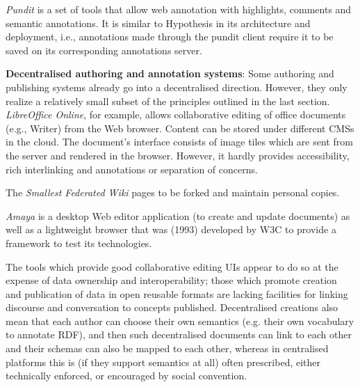 \documentclass[a4paper]{llncs}
\begin{document}
                                \textit{Pundit} is a set of tools that allow web annotation with highlights, comments and semantic annotations. It is similar to Hypothesis in its architecture and deployment, i.e., annotations made through the pundit client require it to be saved on its corresponding annotations server.




                            

                            
\par 
                                \textbf{Decentralised authoring and annotation systems}:
                                Some authoring and publishing systems already go into a decentralised direction. However, they only realize a relatively small subset of the principles outlined in the last section. \textit{LibreOffice Online}, for example, allows collaborative editing of office documents (e.g., Writer) from the Web browser. Content can be stored under different CMSs in the cloud. The document’s interface consists of image tiles which are sent from the server and rendered in the browser. However, it hardly provides accessibility, rich interlinking and annotations or separation of concerns.

                                The \textit{Smallest Federated Wiki} pages to be forked and maintain personal copies.

                                

                                \textit{Amaya} is a desktop Web editor application (to create and update documents) as well as a lightweight browser that was (1993) developed by W3C to provide a framework to test its technologies.
                            

                            
\par The tools which provide good collaborative editing UIs appear to do so at the expense of data ownership and interoperability; those which promote creation and publication of data in open reusable formats are lacking facilities for linking discourse and conversation to concepts published. Decentralised creations also mean that each author can choose their own semantics (e.g. their own vocabulary to annotate RDF), and then such decentralised documents can link to each other and their schemas can also be mapped to each other, whereas in centralised platforms this is (if they support semantics at all) often prescribed, either technically enforced, or encouraged by social convention.
                        
\end{document}
